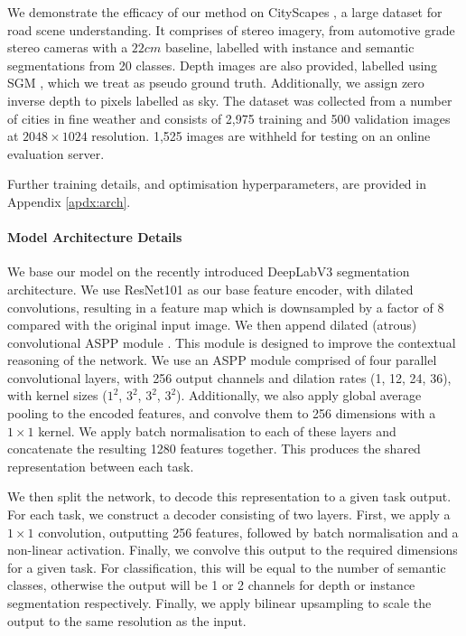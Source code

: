 We demonstrate the efficacy of our method on CityScapes \cite{Cordts2016Cityscapes}, a large dataset for road scene understanding. It comprises of stereo imagery, from automotive grade stereo cameras with a $22cm$ baseline, labelled with instance and semantic segmentations from 20 classes. Depth images are also provided, labelled using SGM \cite{Hirschmuller2008}, which we treat as pseudo ground truth. Additionally, we assign zero inverse depth to pixels labelled as sky. The dataset was collected from a number of cities in fine weather and consists of 2,975 training and 500 validation images at $2048\times1024$ resolution. 1,525 images are withheld for testing on an online evaluation server.

Further training details, and optimisation hyperparameters, are provided in Appendix \ref{apdx:arch}.


\paragraph{Model Architecture Details}
We base our model on the recently introduced DeepLabV3 \cite{chen2017rethinking} segmentation architecture.
We use ResNet101 \cite{he2016deep} as our base feature encoder, with dilated convolutions, resulting in a feature map which is downsampled by a factor of 8 compared with the original input image. 
We then append dilated (atrous) convolutional ASPP module \cite{chen2017rethinking}. This module is designed to improve the contextual reasoning of the network. We use an ASPP module comprised of four parallel convolutional layers, with 256 output channels and dilation rates (1, 12, 24, 36), with kernel sizes ($1^2$, $3^2$, $3^2$, $3^2$). Additionally, we also apply global average pooling to the encoded features, and convolve them to 256 dimensions with a $1 \times 1$ kernel. We apply batch normalisation to each of these layers and concatenate the resulting 1280 features together. This produces the shared representation between each task.

We then split the network, to decode this representation to a given task output. For each task, we construct a decoder consisting of two layers. First, we apply a $1 \times 1$ convolution, outputting 256 features, followed by batch normalisation and a non-linear activation. Finally, we convolve this output to the required dimensions for a given task. For classification, this will be equal to the number of semantic classes, otherwise the output will be 1 or 2 channels for depth or instance segmentation respectively. Finally, we apply bilinear upsampling
to scale the output to the same resolution as the input.

